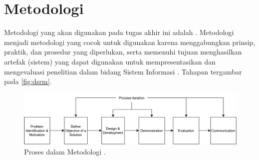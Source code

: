 \section{Metodologi}
\label{sec:metodologi}

Metodologi yang akan digunakan pada tugas akhir ini adalah \dsrmfull. Metodologi \dsrm{} menjadi metodologi yang cocok untuk digunakan karena menggabungkan prinsip, praktik, dan prosedur yang diperlukan, serta memenuhi tujuan menghasilkan artefak (sistem) yang dapat digunakan untuk mempresentasikan dan mengevaluasi penelitian dalam bidang Sistem Informasi \parencite{peffers2007dsrm}. Tahapan \dsrm{} tergambar pada \autoref{fig:dsrm}.

\begin{figure}[htbp]
	\centering
	\includegraphics[width=.8\textwidth]{images/dsrm.png}
	\caption{Proses dalam Metodologi \dsrm{} \parencite{peffers2007dsrm}.}
	\label{fig:dsrm}
\end{figure}

